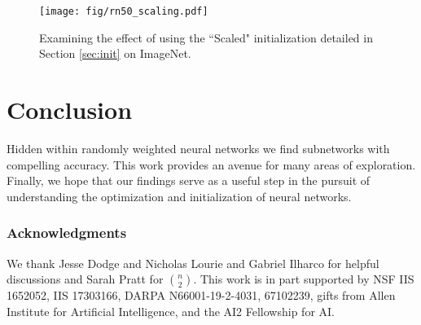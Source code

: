 \documentclass[10pt,twocolumn,letterpaper]{article}
\begin{document}
\begin{figure}[t]
\begin{center}
\texttt{[image: fig/rn50\_scaling.pdf]}
 
\end{center}
  \caption{Examining the effect of using the ``Scaled" initialization detailed in Section \ref{sec:init} on ImageNet.}
\label{fig:rn50_scaling}
\end{figure}
\vspace{-1em}

\section{Conclusion}

Hidden within randomly weighted neural networks we find subnetworks with compelling accuracy. This work provides an avenue for many areas of exploration. Finally, we hope that our findings serve as a useful step in the pursuit of understanding the optimization and initialization of neural networks.
\small{
\subsubsection*{Acknowledgments}
We thank Jesse Dodge and Nicholas Lourie and Gabriel Ilharco for helpful discussions and Sarah Pratt for ${n \choose 2}$. This work is in part supported by NSF IIS 1652052, IIS 17303166, DARPA N66001-19-2-4031,  67102239, gifts from  Allen Institute for Artificial Intelligence, and the AI2 Fellowship for AI.
}

{\small


}

\clearpage
 
\end{document}
